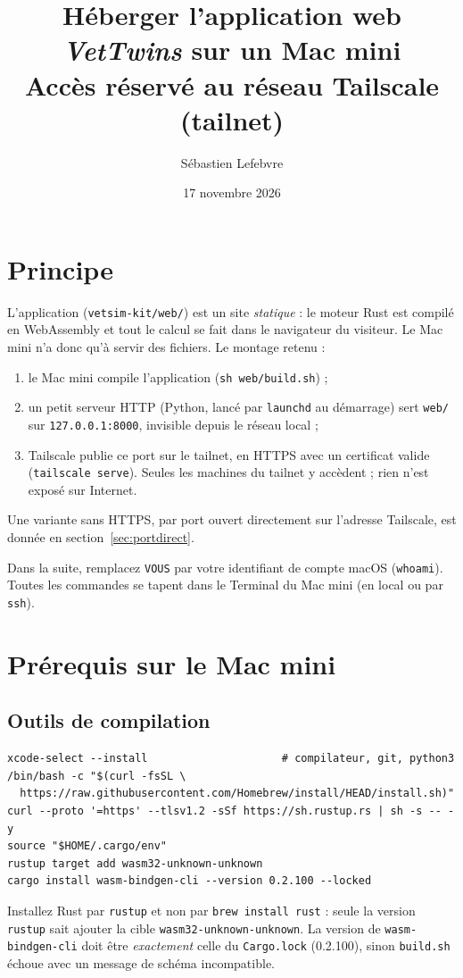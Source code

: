 \documentclass[11pt,a4paper]{article}
\title{Héberger l'application web \emph{VetTwins} sur un Mac mini\\[0.3em]
\large Accès réservé au réseau Tailscale (tailnet)}
\author{Sébastien Lefebvre}
\date{17 novembre 2026}
\newcommand{\cmd}[1]{\texttt{#1}}
\newcommand{\aremplacer}[1]{\textcolor{red!60!black}{\texttt{#1}}}
\begin{document}
\sloppy
\maketitle

\begin{center}
\end{center}

\section{Principe}
L'application (\cmd{vetsim-kit/web/}) est un site \emph{statique} : le moteur Rust est compilé en WebAssembly et tout le calcul se fait dans le navigateur du visiteur. Le Mac mini n'a donc qu'à servir des fichiers. Le montage retenu :
\begin{enumerate}
  \item le Mac mini compile l'application (\cmd{sh web/build.sh}) ;
  \item un petit serveur HTTP (Python, lancé par \cmd{launchd} au démarrage) sert \cmd{web/} sur \cmd{127.0.0.1:8000}, invisible depuis le réseau local ;
  \item Tailscale publie ce port sur le tailnet, en HTTPS avec un certificat valide (\cmd{tailscale serve}). Seules les machines du tailnet y accèdent ; rien n'est exposé sur Internet.
\end{enumerate}
Une variante sans HTTPS, par port ouvert directement sur l'adresse Tailscale, est donnée en section~\ref{sec:portdirect}.

Dans la suite, remplacez \aremplacer{VOUS} par votre identifiant de compte macOS (\cmd{whoami}). Toutes les commandes se tapent dans le Terminal du Mac mini (en local ou par \cmd{ssh}).

\section{Prérequis sur le Mac mini}
\subsection{Outils de compilation}
\begin{Verbatim}
xcode-select --install                     # compilateur, git, python3
/bin/bash -c "$(curl -fsSL \
  https://raw.githubusercontent.com/Homebrew/install/HEAD/install.sh)"
curl --proto '=https' --tlsv1.2 -sSf https://sh.rustup.rs | sh -s -- -y
source "$HOME/.cargo/env"
rustup target add wasm32-unknown-unknown
cargo install wasm-bindgen-cli --version 0.2.100 --locked
\end{Verbatim}
Installez Rust par \cmd{rustup} et non par \cmd{brew install rust} : seule la version \cmd{rustup} sait ajouter la cible \cmd{wasm32-unknown-unknown}. La version de \cmd{wasm-bindgen-cli} doit être \emph{exactement} celle du \cmd{Cargo.lock} (0.2.100), sinon \cmd{build.sh} échoue avec un message de schéma incompatible.
\end{document}

